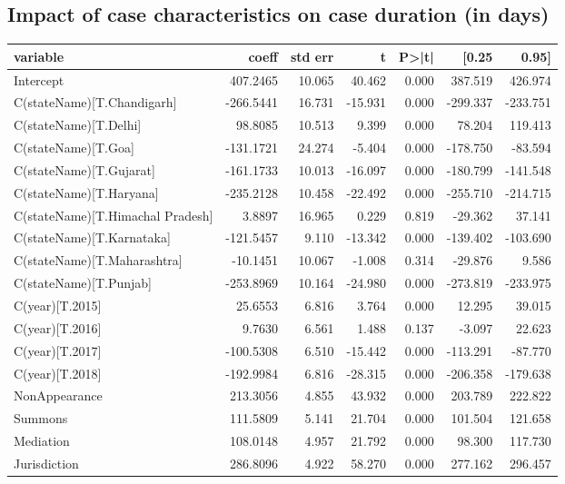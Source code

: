\subsection{Impact of case characteristics on case duration (in days)}
\label{sec:impact-case-char}
{\footnotesize
  \begin{longtable}{@{}lrrrrrr@{}}
\label{tab:duration_reg}\\
\toprule
variable & coeff & std err & t & P>|t| & [0.25 & 0.95] \\\midrule
\endhead
Intercept & 407.2465 & 10.065 & 40.462 & 0.000 & 387.519 & 426.974 \\
C(stateName)[T.Chandigarh] & -266.5441 & 16.731 & -15.931 & 0.000 & -299.337 & -233.751 \\
C(stateName)[T.Delhi] & 98.8085 & 10.513 & 9.399 & 0.000 & 78.204 & 119.413 \\
C(stateName)[T.Goa] & -131.1721 & 24.274 & -5.404 & 0.000 & -178.750 & -83.594 \\
C(stateName)[T.Gujarat] & -161.1733 & 10.013 & -16.097 & 0.000 & -180.799 & -141.548 \\
C(stateName)[T.Haryana] & -235.2128 & 10.458 & -22.492 & 0.000 & -255.710 & -214.715 \\
C(stateName)[T.Himachal Pradesh] & 3.8897 & 16.965 & 0.229 & 0.819 & -29.362 & 37.141 \\
C(stateName)[T.Karnataka] & -121.5457 & 9.110 & -13.342 & 0.000 & -139.402 & -103.690 \\
C(stateName)[T.Maharashtra] & -10.1451 & 10.067 & -1.008 & 0.314 & -29.876 & 9.586 \\
C(stateName)[T.Punjab] & -253.8969 & 10.164 & -24.980 & 0.000 & -273.819 & -233.975 \\
C(year)[T.2015] & 25.6553 & 6.816 & 3.764 & 0.000 & 12.295 & 39.015 \\
C(year)[T.2016] & 9.7630 & 6.561 & 1.488 & 0.137 & -3.097 & 22.623 \\
C(year)[T.2017] & -100.5308 & 6.510 & -15.442 & 0.000 & -113.291 & -87.770 \\
C(year)[T.2018] & -192.9984 & 6.816 & -28.315 & 0.000 & -206.358 & -179.638 \\
NonAppearance & 213.3056 & 4.855 & 43.932 & 0.000 & 203.789 & 222.822 \\
Summons & 111.5809 & 5.141 & 21.704 & 0.000 & 101.504 & 121.658 \\
Mediation & 108.0148 & 4.957 & 21.792 & 0.000 & 98.300 & 117.730 \\
Jurisdiction & 286.8096 & 4.922 & 58.270 & 0.000 & 277.162 & 296.457 \\

\end{longtable}}

